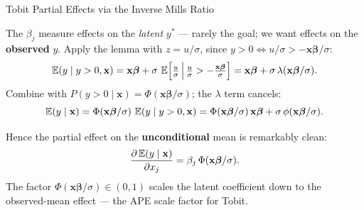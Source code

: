 \documentclass[aspectratio=169, 12pt]{beamer}
\newcommand{\xbeta}{\mathbf{x}\boldsymbol{\beta}}   %
\begin{document}
\begin{frame}[shrink=8]{Tobit Partial Effects via the Inverse Mills Ratio}

  The $\beta_j$ measure effects on the \emph{latent} $y^{*}$ --- rarely the goal;
  we want effects on the \textbf{observed} $y$. Apply the lemma with $z=u/\sigma$,
  since $y>0 \Leftrightarrow u/\sigma > -\xbeta/\sigma$:
  \[
    \E(y\mid y>0,\mathbf{x})
      = \xbeta + \sigma\,\E\!\Big[\tfrac{u}{\sigma}\,\Big|\,
        \tfrac{u}{\sigma} > -\tfrac{\xbeta}{\sigma}\Big]
      = \xbeta + \sigma\,\lambda(\xbeta/\sigma).
  \]
  Combine with $P(y>0\mid\mathbf{x})=\Phi(\xbeta/\sigma)$; the $\lambda$ term cancels:
  \[
    \E(y\mid\mathbf{x}) = \Phi(\xbeta/\sigma)\,\E(y\mid y>0,\mathbf{x})
      = \Phi(\xbeta/\sigma)\,\xbeta + \sigma\,\phi(\xbeta/\sigma).
  \]

  \begin{keybox}
    \small
    Hence the partial effect on the \textbf{unconditional} mean is remarkably clean:
    \[
      \frac{\partial\E(y\mid\mathbf{x})}{\partial x_j} = \beta_j\,\Phi(\xbeta/\sigma).
    \]
    The factor $\Phi(\xbeta/\sigma)\in(0,1)$ scales the latent coefficient down to
    the observed-mean effect --- the APE scale factor for Tobit.
  \end{keybox}

\end{frame}
\end{document}
